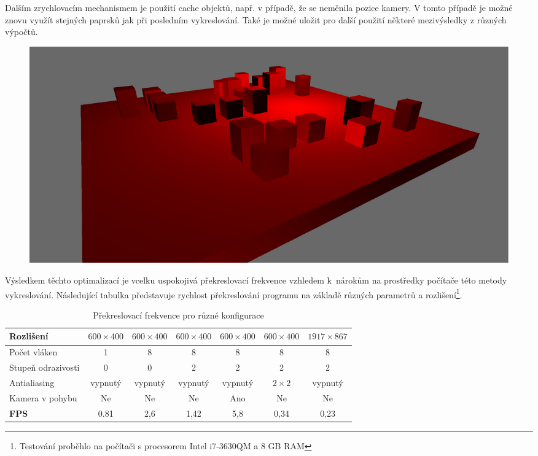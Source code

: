 \documentclass[12pt,a4paper,titlepage,final]{report}
\begin{document}
Dalším zrychlovacím mechanismem je použití cache objektů, např. v případě, že se neměnila pozice kamery. V tomto případě je možné znovu využít stejných paprsků jak při posledním vykreslování. Také je možné uložit pro další použití některé mezivýsledky z různých výpočtů.

\begin{figure}[H]
	\centering
	\captionsetup{type=figure}
	\includegraphics[width=0.8\linewidth]{images/camera.png}
	\label{camera}
\end{figure}

Výsledkem těchto optimalizací je vcelku uspokojivá překreslovací frekvence vzhledem k~nárokům na prostředky počítače této metody vykreslování. Následující tabulka představuje rychlost překreslování programu na základě různých parametrů a rozlišení\footnote{Testování proběhlo na počítači s procesorem Intel i7-3630QM a 8 GB RAM}.

\begin{table}[H]
	\begin{center}
		\begin{tabular}{| l | c | c | c | c| c | c |}
			\hline
			Rozlišení & $600\times400$ & $600\times400$ & $600\times400$ & $600\times400$ & $600\times400$ & $1917\times867$
			\\ \hline
			
			Počet vláken & 1 & 8 & 8 & 8 & 8 & 8
			\\ \hline
			
			Stupeň odrazivosti & 0 & 0 & 2 & 2 & 2 & 2
			\\ \hline
			
			Antialiasing & vypnutý & vypnutý & vypnutý & vypnutý & $2\times2$ & vypnutý
			\\ \hline
			
			Kamera v pohybu & Ne & Ne & Ne & Ano & Ne & Ne
			\\ \hline
			
			\textbf{FPS} & 0.81 & 2,6 & 1,42 & 5,8 & 0,34 & 0,23
			\\ \hline
		\end{tabular}
	\end{center}	
	\caption{Překreslovací frekvence pro různé konfigurace}  
\end{table}
\end{document}
